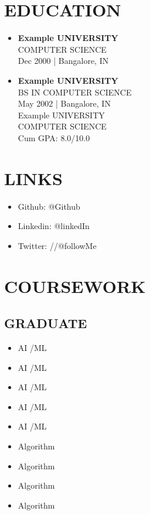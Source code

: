 \documentclass[10pt,letterpaper]{article}
\begin{document}
\begin{multicols*}{2} %

\section*{EDUCATION}
\begin{itemize}[leftmargin=*, nosep, itemsep=0pt, parsep=0pt, topsep=0pt, partopsep=0pt]
    \item \textbf{Example UNIVERSITY} \\
    \footnotesize COMPUTER SCIENCE \\
    \footnotesize Dec 2000 | Bangalore, IN

    \item \textbf{Example UNIVERSITY} \\
    \footnotesize BS IN COMPUTER SCIENCE \\
    \footnotesize May 2002 | Bangalore, IN \\
    \footnotesize Example UNIVERSITY \\
    \footnotesize COMPUTER SCIENCE \\
    \footnotesize Cum GPA: 8.0/10.0 \\

\end{itemize}

\section*{LINKS}
\begin{itemize}[leftmargin=*, nosep, itemsep=0pt, parsep=0pt, topsep=0pt, partopsep=0pt]
    \item Github: @Github
    \item Linkedin: @linkedIn
        \item Twitter: //@followMe
\end{itemize}

\section*{COURSEWORK}
\subsection*{GRADUATE}
\begin{itemize}[leftmargin=*, nosep, itemsep=0pt, parsep=0pt, topsep=0pt, partopsep=0pt]
    \item AI /ML
    \item AI /ML
    \item AI /ML
    \item AI /ML
    \item AI /ML
    \item Algorithm
    \item Algorithm
    \item Algorithm
    \item Algorithm
    

\end{itemize}
\end{multicols*}
\end{document}
